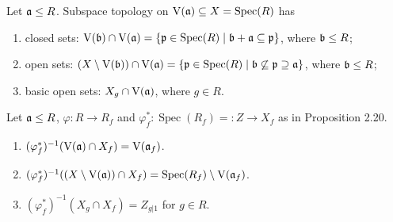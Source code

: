\begin{remark}
    Let $\mathfrak{a} \leq R$. Subspace topology on $\operatorname{V}(\mathfrak{a}) \subseteq X = \operatorname{Spec}(R)$ has 
    \begin{enumerate}
        \item closed sets: $\operatorname{V}(\mathfrak{b}) \cap \operatorname{V}(\mathfrak{a}) = \{\mathfrak{p} \in \operatorname{Spec}(R) \mid \mathfrak{b} + \mathfrak{a} \subseteq \mathfrak{p}\}$, where $\mathfrak{b} \leq R$;
        \item open sets: $(X \setminus \operatorname{V}(\mathfrak{b})) \cap \operatorname{V}(\mathfrak{a}) = \{\mathfrak{p} \in \operatorname{Spec}(R) \mid \mathfrak{b} \not \subseteq \mathfrak{p} \supseteq \mathfrak{a}\}$, where $\mathfrak{b} \leq R$;
        \item basic open sets: $X_g \cap \operatorname{V}(\mathfrak{a})$, where $g \in R$.
    \end{enumerate}
\end{remark}

\begin{proposition}
    Let $\mathfrak{a} \leq R$, $\varphi: R \to R_f$ and $\varphi_f^*: \operatorname{Spec}(R_f) =: Z \to X_f$ as in Proposition 2.20. 
    \begin{enumerate}
        \item 
            $(\varphi_f^*)^{-1}(\operatorname{V}(\mathfrak{a}) \cap X_f) = \operatorname{V}(\mathfrak{a}_f)$. 
        \item
            $(\varphi_f^*)^{-1}((X \setminus \operatorname{V}(\mathfrak{a})) \cap X_f) = \operatorname{Spec}(R_f) \setminus \operatorname{V}(\mathfrak{a}_f)$.
        \item 
            $(\varphi_f^*)^{-1}(X_g \cap X_f) = Z_{g|1}$ for $g \in R$.
    \end{enumerate}
\end{proposition}


